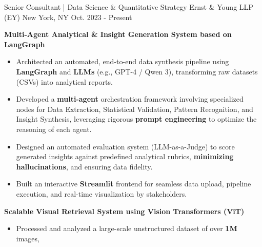 

\begin{cventries}

\cventry
  {Senior Consultant | Data Science \& Quantitative Strategy}
  {Ernst \& Young LLP (EY)}
  {New York, NY}
  {Oct. 2023 - Present}
  {
    \begin{cvitems}
      \item {\textbf{Multi-Agent Analytical \& Insight Generation System based on LangGraph}}
        \begin{itemize}
          \item {
            Architected an automated, end-to-end data synthesis pipeline 
            using \textbf{LangGraph} and \textbf{LLMs} (e.g., GPT-4 / Qwen 3), 
            transforming raw datasets (CSVs) into analytical reports.
          }
          \item {
            Developed a \textbf{multi-agent} orchestration framework involving 
            specialized nodes for Data Extraction, Statistical Validation, 
            Pattern Recognition, and Insight Synthesis, 
            leveraging rigorous \textbf{prompt engineering} to optimize the reasoning of each agent.
          }
          \item {
            Designed an automated evaluation system (LLM-as-a-Judge) to 
            score generated insights against predefined analytical rubrics,
            \textbf{minimizing hallucinations}, and ensuring data fidelity.
          }
          \item {
            Built an interactive \textbf{Streamlit} frontend for seamless data upload, 
            pipeline execution, and real-time visualization by stakeholders.
          }
        \end{itemize}
      \vspace{0.5mm}
      \item {\textbf{Scalable Visual Retrieval System using Vision Transformers (ViT)}}
        \begin{itemize}
          \item {
            Processed and analyzed a large-scale unstructured dataset of over \textbf{1M} images, 
}
\end{itemize}
\end{cvitems}}
\end{cventries}
